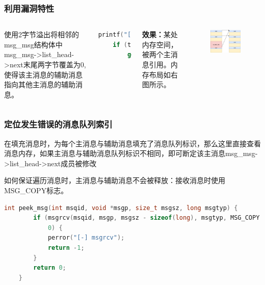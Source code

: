 \documentclass[xcolor=table]{beamer}
\begin{document}
\begin{frame}[fragile]
\frametitle{利用漏洞特性}

\begin{columns}[c]

\small{使用2字节溢出将相邻的msg\_msg结构体中msg\_msg->list\_head->next末尾两字节覆盖为0, 使得该主消息的辅助消息指向其他主消息的辅助消息。}

\tiny\begin{lstlisting}[language=c]
    printf("[*] Triggering out-of-bounds write...\n");
    if (trigger_oob_write(s) < 0)
        goto err_rmid;
\end{lstlisting}

\small{\textbf{效果：}某处内存空间，被两个主消息引用。内存布局如右图所示。}

\begin{figure}[H]
\centering
\includegraphics[width=\textwidth]{pic/4}%
\end{figure}


\end{columns}
\end{frame}

\begin{frame}[fragile]
\frametitle{定位发生错误的消息队列索引}
\small{在填充消息时，为每个主消息与辅助消息填充了消息队列标识，那么这里直接查看消息内存，如果主消息与辅助消息队列标识不相同，即可断定该主消息msg\_msg->list\_head->next成员被修改

如何保证遍历消息时，主消息与辅助消息不会被释放：接收消息时使用MSG\_COPY标志。}

\tiny\begin{lstlisting}[language=c]
    int peek_msg(int msqid, void *msgp, size_t msgsz, long msgtyp) {
        if (msgrcv(msqid, msgp, msgsz - sizeof(long), msgtyp, MSG_COPY | IPC_NOWAIT) <
            0) {
            perror("[-] msgrcv");
            return -1;
        }
        return 0;
    }
\end{lstlisting}

\end{frame}
\end{document}
